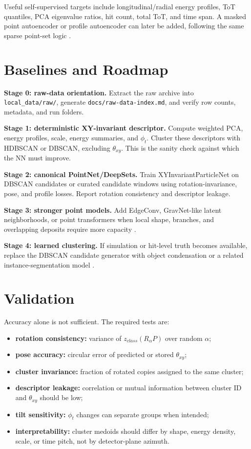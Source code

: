 \documentclass[11pt,a4paper]{article}
\newcommand{\code}[1]{\texttt{#1}}
\newcommand{\thetaxy}{\theta_{xy}}
\newcommand{\phit}{\phi_t}
\begin{document}
Useful self-supervised targets include longitudinal/radial energy profiles, ToT quantiles, PCA eigenvalue ratios, hit count, total ToT, and time span. A masked point autoencoder or profile autoencoder can later be added, following the same sparse point-set logic \citep{young2025polarmae}.

\section{Baselines and Roadmap}

\textbf{Stage 0: raw-data orientation.} Extract the raw archive into \code{local\_data/raw/}, generate \code{docs/raw-data-index.md}, and verify row counts, metadata, and run folders.

\textbf{Stage 1: deterministic XY-invariant descriptor.} Compute weighted PCA, energy profiles, scale, energy summaries, and $\phit$. Cluster these descriptors with HDBSCAN or DBSCAN, excluding $\thetaxy$. This is the sanity check against which the NN must improve.

\textbf{Stage 2: canonical PointNet/DeepSets.} Train XYInvariantParticleNet on DBSCAN candidates or curated candidate windows using rotation-invariance, pose, and profile losses. Report rotation consistency and descriptor leakage.

\textbf{Stage 3: stronger point models.} Add EdgeConv, GravNet-like latent neighborhoods, or point transformers when local shape, branches, and overlapping deposits require more capacity \citep{qasim2019gravnet,qu2020particlenet,qu2022part}.

\textbf{Stage 4: learned clustering.} If simulation or hit-level truth becomes available, replace the DBSCAN candidate generator with object condensation or a related instance-segmentation model \citep{kieseler2020objectcondensation,qasim2021hgcal_oc,garcia2026hitpf}.

\section{Validation}

Accuracy alone is not sufficient. The required tests are:
\begin{itemize}
    \item \textbf{rotation consistency:} variance of $z_{class}(R_\alpha P)$ over random $\alpha$;
    \item \textbf{pose accuracy:} circular error of predicted or stored $\thetaxy$;
    \item \textbf{cluster invariance:} fraction of rotated copies assigned to the same cluster;
    \item \textbf{descriptor leakage:} correlation or mutual information between cluster ID and $\thetaxy$ should be low;
    \item \textbf{tilt sensitivity:} $\phit$ changes can separate groups when intended;
    \item \textbf{interpretability:} cluster medoids should differ by shape, energy density, scale, or time pitch, not by detector-plane azimuth.
\end{itemize}
\end{document}
